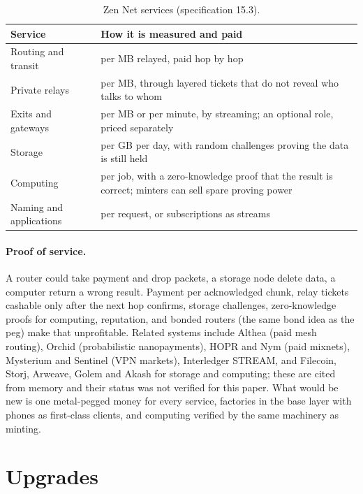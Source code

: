 \begin{table}[htbp]
\centering\small
\begin{tabularx}{\textwidth}{l Y}
\toprule
\textbf{Service} & \textbf{How it is measured and paid}\\
\midrule
Routing and transit & per MB relayed, paid hop by hop\\
Private relays & per MB, through layered tickets that do not reveal who talks to whom\\
Exits and gateways & per MB or per minute, by streaming; an optional role, priced separately\\
Storage & per GB per day, with random challenges proving the data is still held\\
Computing & per job, with a zero-knowledge proof that the result is correct; minters can sell spare proving power\\
Naming and applications & per request, or subscriptions as streams\\
\bottomrule
\end{tabularx}
\caption{Zen Net services (specification 15.3).}
\end{table}

\paragraph{Proof of service.} A router could take payment and drop packets, a storage node delete data, a computer return a wrong result. Payment per acknowledged chunk, relay tickets cashable only after the next hop confirms, storage challenges, zero-knowledge proofs for computing, reputation, and bonded routers (the same bond idea as the peg) make that unprofitable. Related systems include Althea (paid mesh routing), Orchid (probabilistic nanopayments), HOPR and Nym (paid mixnets), Mysterium and Sentinel (VPN markets), Interledger STREAM, and Filecoin, Storj, Arweave, Golem and Akash for storage and computing; these are cited from memory and their status was not verified for this paper. What would be new is one metal-pegged money for every service, factories in the base layer with phones as first-class clients, and computing verified by the same machinery as minting.

\section{Upgrades}\label{sec:upgrades}

